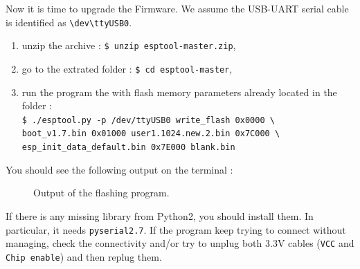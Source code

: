 \documentclass[11pt]{article}
\begin{document}
Now it is time to upgrade the Firmware. We assume the USB-UART serial cable is identified as \texttt{\textbackslash dev\textbackslash ttyUSB0}.
\begin{enumerate}
\item unzip the archive : \texttt{\$ unzip esptool-master.zip},
\item go to the extrated folder : \texttt{\$ cd esptool-master},
\item run the program the with flash memory parameters already located in the folder : \\
\texttt{\$ ./esptool.py -p /dev/ttyUSB0 write\_flash 0x0000 \textbackslash \\
boot\_v1.7.bin 0x01000 user1.1024.new.2.bin 0x7C000 \textbackslash \\
esp\_init\_data\_default.bin 0x7E000 blank.bin}
\end{enumerate}
You should see the following output on the terminal :
\begin{figure}[H]
\caption{Output of the flashing program.}
\label{Flashing_eps8266}
\end{figure}
If there is any missing library from Python2, you should install them. In particular, it needs \texttt{pyserial2.7}.
If the program keep trying to connect without managing, check the connectivity and/or try to unplug both 3.3V cables (\texttt{VCC} and \texttt{Chip enable}) and then replug them.
\end{document}
